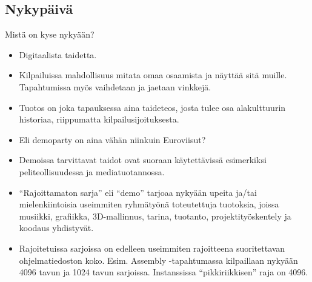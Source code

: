 \documentclass[pdf,10pt,handout]{beamer}
\begin{document}
\subsection{Nykypäivä}
\begin{frame}{Mistä on kyse nykyään?}
  \begin{itemize}
  \item Digitaalista taidetta.
  \item Kilpailuissa mahdollisuus mitata omaa osaamista ja näyttää
    sitä muille. Tapahtumissa myös vaihdetaan ja jaetaan vinkkejä.
  \item Tuotos on joka tapauksessa aina taideteos, josta tulee osa
    alakulttuurin historiaa, riippumatta kilpailusijoituksesta.
  \item Eli demoparty on aina vähän niinkuin Euroviisut?
  \item Demoissa tarvittavat taidot ovat suoraan käytettävissä
    esimerkiksi peliteollisuudessa ja mediatuotannossa.
  \item ``Rajoittamaton sarja'' eli ``demo'' tarjoaa nykyään upeita
    ja/tai mielenkiintoisia useimmiten ryhmätyönä toteutettuja
    tuotoksia, joissa musiikki, grafiikka, 3D-mallinnus, tarina,
    tuotanto, projektityöskentely ja koodaus yhdistyvät.
  \item Rajoitetuissa sarjoissa on edelleen useimmiten rajoitteena
    suoritettavan ohjelmatiedoston koko. Esim. Assembly -tapahtumassa
    kilpaillaan nykyään 4096 tavun ja 1024 tavun
    sarjoissa. Instanssissa ``pikkiriikkisen'' raja on 4096.
  \end{itemize}
\end{frame}
\end{document}
